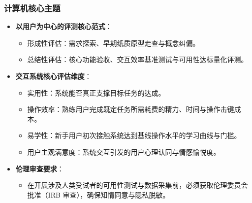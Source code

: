 \subsubsection{计算机核心主题}
\begin{itemize}
    \item \textbf{以用户为中心的评测核心范式}：
    \begin{itemize}
        \item 形成性评估：需求探索、早期纸质原型走查与概念纠偏。
        \item 总结性评估：核心功能验收、交互效率基准测试与可用性达标量化评测。
    \end{itemize}
    \item \textbf{交互系统核心评估维度}：
    \begin{itemize}
        \item 实用性：系统能否真正支撑目标任务的达成。
        \item 操作效率：熟练用户完成既定任务所需耗费的精力、时间与操作击键成本。
        \item 易学性：新手用户初次接触系统达到基线操作水平的学习曲线与门槛。
        \item 用户主观满意度：系统交互引发的用户心理认同与情感愉悦度。
    \end{itemize}
    \item \textbf{伦理审查要求}：
    \begin{itemize}
        \item 在开展涉及人类受试者的可用性测试与数据采集前，必须获取伦理委员会批准（IRB 审查），确保知情同意与隐私脱敏。
    \end{itemize}
\end{itemize}

